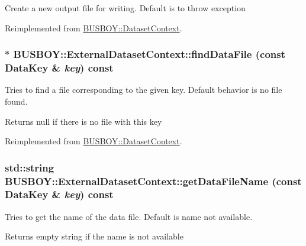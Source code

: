 Create a new output file for writing. Default is to throw exception 

Reimplemented from \hyperlink{classBUSBOY_1_1DatasetContext_a76ffe901522f6cfc86a09ed3e5087abb}{BUSBOY::DatasetContext}.\hypertarget{classBUSBOY_1_1ExternalDatasetContext_a59835bb9652ace84e3962feb993e4801}{
\subsubsection[{findDataFile}]{ $\ast$ BUSBOY::ExternalDatasetContext::findDataFile (const {\bf DataKey} \& {\em key}) const}}
\label{classBUSBOY_1_1ExternalDatasetContext_a59835bb9652ace84e3962feb993e4801}


Tries to find a file corresponding to the given key. Default behavior is no file found. \begin{DoxyReturn}{Returns}
null if there is no file with this key 
\end{DoxyReturn}


Reimplemented from \hyperlink{classBUSBOY_1_1DatasetContext_a37fe67fa469141703703e7eee9c50a14}{BUSBOY::DatasetContext}.\hypertarget{classBUSBOY_1_1ExternalDatasetContext_a263a61c46130cbed03bd843637955f1a}{
\subsubsection[{getDataFileName}]{\setlength{\rightskip}{0pt plus 5cm}std::string BUSBOY::ExternalDatasetContext::getDataFileName (const {\bf DataKey} \& {\em key}) const}}
\label{classBUSBOY_1_1ExternalDatasetContext_a263a61c46130cbed03bd843637955f1a}


Tries to get the name of the data file. Default is name not available. \begin{DoxyReturn}{Returns}
empty string if the name is not available 
\end{DoxyReturn}


